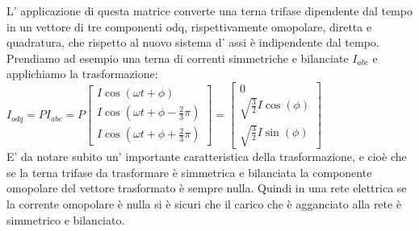 \documentclass[Lau,noexaminfo]{sapthesis}
\begin{document}
	L' applicazione di questa matrice converte una terna trifase dipendente dal tempo in un vettore di tre componenti odq, rispettivamente omopolare, diretta e quadratura, che rispetto al nuovo sistema d' assi è indipendente dal tempo.\\
	Prendiamo ad esempio una terna di correnti simmetriche e bilanciate $I_{abc}$ e applichiamo la trasformazione:\\
	$I_{odq}=P I_{abc}=P \begin{bmatrix}
	I\cos(\omega t + \phi)\\
	I\cos(\omega t + \phi -\frac{2}{3}\pi) \\
	I\cos(\omega t + \phi +\frac{2}{3}\pi)
	\end{bmatrix}=
	\begin{bmatrix}
	0 \\
	\sqrt{\frac{3}{2}}I\cos(\phi)\\
	\sqrt{\frac{3}{2}}I\sin(\phi)
	\end{bmatrix}
	$\\
	E' da notare subito un' importante caratteristica della trasformazione, e cioè che se la terna trifase da trasformare è simmetrica e bilanciata la componente omopolare del vettore trasformato è sempre nulla. Quindi in una rete elettrica se la corrente omopolare è nulla si è sicuri che il carico che è agganciato alla rete è simmetrico e bilanciato.
\end{document}
